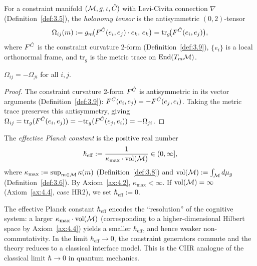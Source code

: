 \begin{definition}
\label{def:5.4}
For a constraint manifold $(\mathcal{M}, g, \iota, \hat{C})$ with Levi-Civita
connection $\nabla$ (Definition~\ref{def:3.5}), the \emph{holonomy
tensor} is the antisymmetric $(0,2)$-tensor
\[
  \Omega_{ij}(m) := g_m\!\bigl(
    F^{\hat{C}}(e_i, e_j) \cdot e_k,\, e_k
  \bigr)
  = \mathrm{tr}_g\!\bigl(F^{\hat{C}}(e_i, e_j)\bigr),
\]
where $F^{\hat{C}}$ is the constraint curvature 2-form
(Definition~\ref{def:3.9}), $\{e_i\}$ is a local orthonormal frame,
and $\mathrm{tr}_g$ is the metric trace on $\mathrm{End}(T_m\mathcal{M})$.
\end{definition}

\begin{lemma}
\label{lem:5.3}
$\Omega_{ij} = -\Omega_{ji}$ for all $i, j$.
\end{lemma}

\begin{proof}
The constraint curvature 2-form $F^{\hat{C}}$ is antisymmetric in its
vector arguments (Definition~\ref{def:3.9}):
$F^{\hat{C}}(e_i, e_j) = -F^{\hat{C}}(e_j, e_i)$.  Taking the metric
trace preserves this antisymmetry, giving
$\Omega_{ij} = \mathrm{tr}_g(F^{\hat{C}}(e_i, e_j))
= -\mathrm{tr}_g(F^{\hat{C}}(e_j, e_i)) = -\Omega_{ji}$.
\end{proof}

\begin{definition}
\label{def:5.5}
The \emph{effective Planck constant} is the positive real number
\[
  \hbar_{\mathrm{eff}} :=
  \frac{1}{\kappa_{\max} \cdot \mathrm{vol}(\mathcal{M})}
  \in (0, \infty],
\]
where $\kappa_{\max} := \sup_{m \in \mathcal{M}} \kappa(m)$
(Definition~\ref{def:3.8}) and $\mathrm{vol}(\mathcal{M}) :=
\int_{\mathcal{M}} d\mu_g$ (Definition~\ref{def:3.6}).  By
Axiom~\textup{\ref{ax:4.2}}, $\kappa_{\max} < \infty$.  If
$\mathrm{vol}(\mathcal{M}) = \infty$ \textup{(}Axiom~\textup{\ref{ax:4.4}},
case HR2\textup{)}, we set $\hbar_{\mathrm{eff}} := 0$.
\end{definition}

\begin{remark}
\label{rem:5.2}
The effective Planck constant $\hbar_{\mathrm{eff}}$ encodes the
``resolution'' of the cognitive system: a larger $\kappa_{\max} \cdot
\mathrm{vol}(\mathcal{M})$ (corresponding to a higher-dimensional Hilbert space
by Axiom~\ref{ax:4.4}) yields a smaller $\hbar_{\mathrm{eff}}$, and
hence weaker non-commutativity.  In the limit
$\hbar_{\mathrm{eff}} \to 0$, the constraint generators commute and the
theory reduces to a classical interface model.  This is the CIIR
analogue of the classical limit $\hbar \to 0$ in quantum mechanics.
\end{remark}

